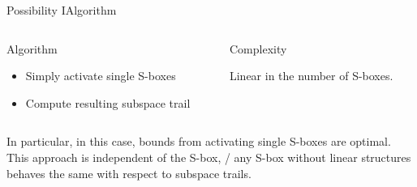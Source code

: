 \begin{frame}{Possibility I}{Algorithm}
    \begin{columns}[t,onlytextwidth]
        \begin{column}{0.5\textwidth}
            \begin{block}{Algorithm}
                \begin{minipage}[t][30pt][t]{\textwidth}
                \begin{itemize}
                    \item Simply activate single S-boxes
                    \item Compute resulting subspace trail
                \end{itemize}
                \end{minipage}
            \end{block}
        \end{column}
        \begin{column}{0.4\textwidth}
            \begin{block}{Complexity}
                \begin{minipage}[t][30pt][t]{\textwidth}
                \vspace{2pt}
                Linear in the number of S-boxes.
                \end{minipage}
            \end{block}
        \end{column}
    \end{columns}
    \vspace{0.5em}
    In particular, in this case, bounds from activating single S-boxes are optimal.\\[1em]
    This approach is independent of the S-box, \ie/ any S-box without linear structures behaves the same with respect to subspace trails.
\end{frame}

